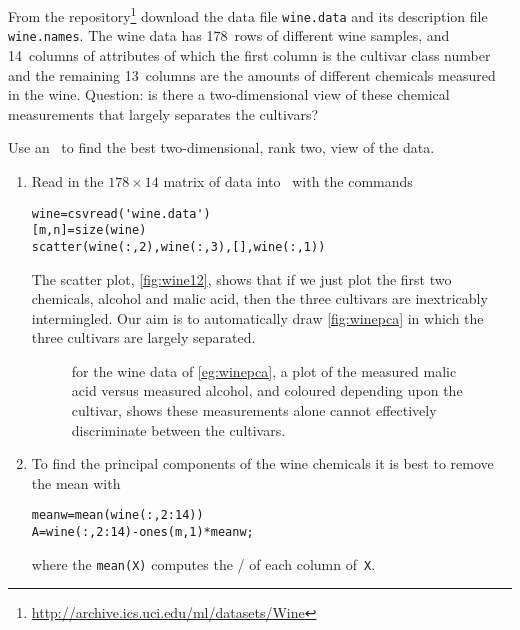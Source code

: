 \begin{example} \label{eg:winepca}
From the \cite{Lichman2013} repository\footnote{\url{http://archive.ics.uci.edu/ml/datasets/Wine}} download the data file \verb|wine.data| and its description file \verb|wine.names|.
The wine data has 178~rows of different wine samples, and 14~columns of attributes of which the first column is the cultivar class number and the remaining 13~columns are the amounts of different chemicals measured in the wine.
Question: is there a two-dimensional view of these chemical measurements that largely separates the cultivars?

\begin{solution} 
Use an \svd\ to find the best two-dimensional, rank two, view of the data.
\begin{enumerate}
\item Read in the \(178\times14\) matrix of data into \script\ with the commands
\begin{verbatim}
wine=csvread('wine.data')
[m,n]=size(wine)
scatter(wine(:,2),wine(:,3),[],wine(:,1))
\end{verbatim}
\setbox\ajrqrbox\hbox{}%
\marginpar{\usebox{\ajrqrbox\\[2ex]}}%
The scatter plot, \autoref{fig:wine12}, shows that if we just plot the first two chemicals, alcohol and malic acid, then the three cultivars are inextricably intermingled.
Our aim is to automatically draw \autoref{fig:winepca} in which the three cultivars are largely separated.
\begin{figure}
\centering

\caption{for the wine data of \autoref{eg:winepca}, a plot of the measured malic acid versus measured alcohol, and coloured depending upon the cultivar, shows these measurements alone cannot effectively discriminate between the cultivars.}
\label{fig:wine12}
\end{figure}


\item To find the principal components of the wine chemicals it is best to remove the mean with
\begin{verbatim}
meanw=mean(wine(:,2:14))
A=wine(:,2:14)-ones(m,1)*meanw;
\end{verbatim}
where the \verb|mean(X)| computes the \slash {} of each column of~\verb|X|.


\end{enumerate}
\end{solution}
\end{example}
